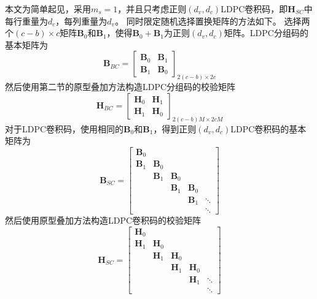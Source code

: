 本文为简单起见，采用$m_s=1$，并且只考虑正则$(d_v,d_c)$LDPC卷积码，即$\mathbf{H}_{SC}$中每行重量为$d_c$，每列重量为$d_v$。
同时限定随机选择置换矩阵的方法如下。
选择两个$(c-b)\times c$矩阵$\mathbf{B}_0$和$\mathbf{B}_1$，使得$\mathbf{B}_0 + \mathbf{B}_1$为正则$(d_v,d_c)$矩阵。LDPC分组码的基本矩阵为
\begin{equation}
    \mathbf{B}_{BC} = \left[
          \begin{array}{cc}
            \mathbf{B}_0 & \mathbf{B}_1\\
            \mathbf{B}_1 & \mathbf{B}_0
          \end{array} \right]_{2(c-b)\times 2c}
\end{equation}
然后使用第二节的原型叠加方法构造LDPC分组码的校验矩阵
\begin{equation}
    \mathbf{H}_{BC} = \left[
          \begin{array}{cc}
            \mathbf{H}_0 & \mathbf{H}_1\\
            \mathbf{H}_1 & \mathbf{H}_0
          \end{array} \right]_{2(c-b)M \times 2cM}
\end{equation}
对于LDPC卷积码，使用相同的$\mathbf{B}_0$和$\mathbf{B}_1$，得到正则$(d_v,d_c)$LDPC卷积码的基本矩阵为
\begin{equation}
    \mathbf{B}_{SC} = \left[
          \begin{array}{ccccc}
            \mathbf{B}_0 & & & & \\
            \mathbf{B}_1 & \mathbf{B}_0 & & & \\
             & \mathbf{B}_1 & \mathbf{B}_0 & & \\
             & & \mathbf{B}_1 & \mathbf{B}_0 & \\
             & & & \mathbf{B}_1 & \ddots \\
             & & & & \ddots
          \end{array} \right]
\end{equation}
然后使用原型叠加方法构造LDPC卷积码的校验矩阵
\begin{equation}
    \mathbf{H}_{SC} = \left[
          \begin{array}{ccccc}
            \mathbf{H}_0 & & & & \\
            \mathbf{H}_1 & \mathbf{H}_0 & & & \\
             & \mathbf{H}_1 & \mathbf{H}_0 & & \\
             & & \mathbf{H}_1 & \mathbf{H}_0 & \\
             & & & \mathbf{H}_1 & \ddots \\
             & & & & \ddots
          \end{array} \right]
\end{equation}
